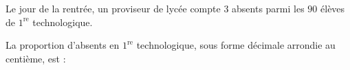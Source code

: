 
Le jour de la rentrée, un proviseur de lycée compte $3$ absents parmi les $90$ élèves de $1^{\text{re}}$ technologique.

La proportion d'absents en $1^{\text{re}}$ technologique, sous forme décimale arrondie au centième, est :

\smallskip
{}
